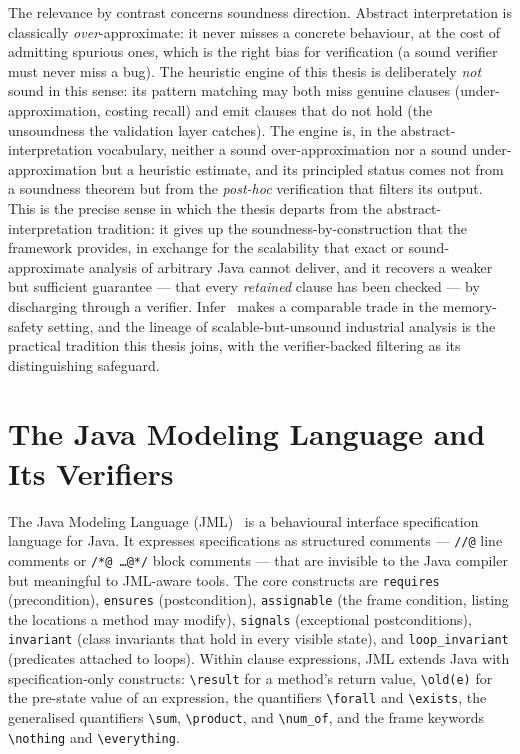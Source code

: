 The relevance by contrast concerns soundness direction. Abstract interpretation
is classically \emph{over}-approximate: it never misses a concrete behaviour, at
the cost of admitting spurious ones, which is the right bias for verification
(a sound verifier must never miss a bug). The heuristic engine of this thesis is
deliberately \emph{not} sound in this sense: its pattern matching may both miss
genuine clauses (under-approximation, costing recall) and emit clauses that do
not hold (the unsoundness the validation layer catches). The engine is, in the
abstract-interpretation vocabulary, neither a sound over-approximation nor a
sound under-approximation but a heuristic estimate, and its principled status
comes not from a soundness theorem but from the \emph{post-hoc} verification that
filters its output. This is the precise sense in which the thesis departs from
the abstract-interpretation tradition: it gives up the soundness-by-construction
that the framework provides, in exchange for the scalability that exact or
sound-approximate analysis of arbitrary Java cannot deliver, and it recovers a
weaker but sufficient guarantee --- that every \emph{retained} clause has been
checked --- by discharging through a verifier. Infer~\cite{calcagno2015infer}
makes a comparable trade in the memory-safety setting, and the lineage of
scalable-but-unsound industrial analysis is the practical tradition this thesis
joins, with the verifier-backed filtering as its distinguishing safeguard.

\section{The Java Modeling Language and Its Verifiers}
\label{sec:bg-jml}

The Java Modeling Language (JML)~\cite{jml, leavens2006design} is a
behavioural interface specification language for Java. It expresses
specifications as structured comments --- \texttt{//@} line comments or
\texttt{/*@ \dots @*/} block comments --- that are invisible to the Java
compiler but meaningful to JML-aware tools. The core constructs are
\texttt{requires} (precondition), \texttt{ensures} (postcondition),
\texttt{assignable} (the frame condition, listing the locations a method may
modify), \texttt{signals} (exceptional postconditions), \texttt{invariant}
(class invariants that hold in every visible state), and
\texttt{loop\_invariant} (predicates attached to loops). Within clause
expressions, JML extends Java with specification-only constructs:
\texttt{\textbackslash result} for a method's return value,
\texttt{\textbackslash old(e)} for the pre-state value of an expression, the
quantifiers \texttt{\textbackslash forall} and \texttt{\textbackslash exists},
the generalised quantifiers \texttt{\textbackslash sum},
\texttt{\textbackslash product}, and \texttt{\textbackslash num\_of}, and the
frame keywords \texttt{\textbackslash nothing} and
\texttt{\textbackslash everything}.

